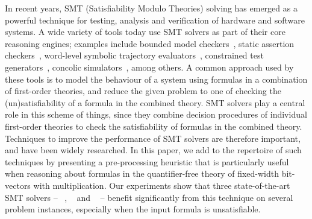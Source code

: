 %
In recent years, SMT (Satisfiability Modulo Theories) solving has
emerged as a powerful technique for testing, analysis and verification
of hardware and software systems.  A wide variety of tools today use
SMT solvers as part of their core reasoning engines; examples include
bounded model checkers~\cite{hwcbmc,boolector,ebmc,cbmc}, static
assertion checkers~\cite{corral,boogie}, word-level symbolic
trajectory evaluators~\cite{wste}, constrained test
generators~\cite{crv,dart}, concolic simulators~\cite{concolic}, among
others.  A common approach used by these tools is to model the
behaviour of a system using formulas in a combination of first-order
theories, and reduce the given problem to one of checking the
(un)satisfiability of a formula in the combined theory.  SMT solvers
play a central role in this scheme of things, since they combine
decision procedures of individual first-order theories to check the
satisfiability of formulas in the combined theory.  Techniques to
improve the performance of SMT solvers are therefore important, and
have been widely researched. In this paper, we add to the repertoire
of such techniques by presenting a pre-processing heuristic that is
particularly useful when reasoning about formulas in the
quantifier-free theory of fixed-width bit-vectors with multiplication.
Our experiments show that three state-of-the-art SMT solvers --
{\zthree}~\cite{zthree}, {\cvcfour}~\cite{cvcfour} and
{\boolector}~\cite{boolector} -- benefit significantly from this
technique on several problem instances, especially when the input
formula is unsatisfiable.


